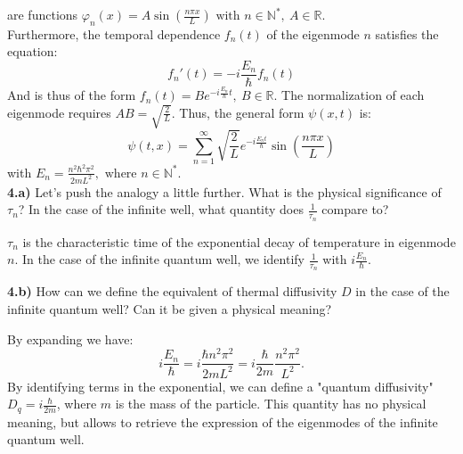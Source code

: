 \noindent are functions $\displaystyle \varphi_n(x)=A\sin \left(\frac{n \pi x}{L}\right) \text{ with } n \in \mathbb{N}^{*}, \: A \in \mathbb{R}$. \\

\noindent Furthermore, the temporal dependence $f_n(t)$ of the eigenmode $n$ satisfies the equation:
\begin{equation*}
    f_n'(t) = -i\frac{E_n}{\hbar}f_n(t)
\end{equation*}
And is thus of the form $\displaystyle f_n(t) = B e^{-i\frac{E_n}{\hbar}t}, \: B \in \mathbb{R}$.
\noindent The normalization of each eigenmode requires $\displaystyle AB = \sqrt{\frac{2}{L}}$.
\noindent Thus, the general form $\psi(x,t)$ is:
$$\boxed{\psi(t, x) = \sum_{n=1}^{\infty} \sqrt{\frac{2}{L}} e^{-i\frac{E_n t}{\hbar}} \sin \left(\frac{n \pi x}{L}\right)}$$
with 
$
\displaystyle E_n = \frac{n^2 \hbar^2 \pi^2}{2mL^2}, \text{ where } n \in \mathbb{N^*}.
$\\

\noindent \textbf{4.a)} Let's push the analogy a little further. What is the physical significance of $\tau_n$? In the case of the infinite well, what quantity does $\frac{1}{\tau_n}$ compare to?\\

\begin{breakbox}
    \noindent $\tau_n$ is the characteristic time of the exponential decay of temperature in eigenmode $n$. In the case of the infinite quantum well, we identify $\displaystyle \frac{1}{\tau_n}$ with $\displaystyle i\frac{E_n}{\hbar}$.
\end{breakbox}

\medskip

\noindent \textbf{4.b)} How can we define the equivalent of thermal diffusivity $D$ in the case of the infinite quantum well? Can it be given a physical meaning?\\

\begin{breakbox}
    \noindent By expanding we have:
    $$i\frac{E_n}{\hbar} = i\frac{\hbar n^2 \pi^2}{2mL^2} = i\frac{\hbar}{2m} \frac{n^2\pi^2}{L^2}.$$
    By identifying terms in the exponential, we can define a "quantum diffusivity" $\displaystyle D_q = i\frac{\hbar}{2m}$, where $m$ is the mass of the particle.
    This quantity has no physical meaning, but allows to retrieve the expression of the eigenmodes of the infinite quantum well.
\end{breakbox}
